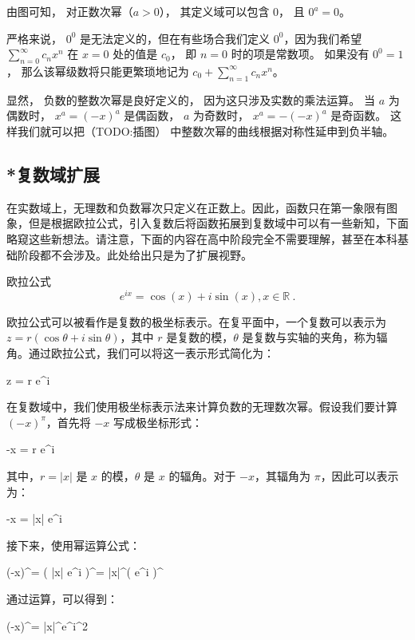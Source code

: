 由图可知， 对正数次幂（$a > 0$）， 其定义域可以包含 $0$， 且 $0^a = 0$。

严格来说， $0^0$ 是无法定义的，但在有些场合我们定义 $0^0$，因为我们希望 $\sum_{n=0}^\infty c_n x^n$ 在 $x = 0$ 处的值是 $c_0$， 即 $n=0$ 时的项是常数项。 如果没有 $0^0 = 1$， 那么该幂级数将只能更繁琐地记为 $c_0 + \sum_{n=1}^\infty c_n x^n$。


显然， 负数的整数次幂是良好定义的， 因为这只涉及实数的乘法运算。 当 $a$ 为偶数时， $x^a = (-x)^a$ 是偶函数， $a$ 为奇数时， $x^a = -(-x)^a$ 是奇函数。 这样我们就可以把（TODO:插图） 中整数次幂的曲线根据对称性延申到负半轴。




\subsection{*复数域扩展}
在实数域上，无理数和负数幂次只定义在正数上。因此，函数只在第一象限有图象，但是根据欧拉公式，引入复数后将函数拓展到复数域中可以有一些新知，下面略窥这些新想法。请注意，下面的内容在高中阶段完全不需要理解，甚至在本科基础阶段都不会涉及。此处给出只是为了扩展视野。

\begin{theorem}{欧拉公式}
\begin{equation}
e^{ix} = \cos(x) + i\sin(x),x\in\mathbb{R}~.
\end{equation}
\end{theorem}

欧拉公式可以被看作是复数的极坐标表示。在复平面中，一个复数可以表示为 $z = r (\cos \theta + i \sin \theta)$，其中 $r$ 是复数的模，$\theta$ 是复数与实轴的夹角，称为辐角。通过欧拉公式，我们可以将这一表示形式简化为：

z = r e^{i\theta}


在复数域中，我们使用极坐标表示法来计算负数的无理数次幂。假设我们要计算 $(-x)^\pi$，首先将 $-x$ 写成极坐标形式：

-x = r \cdot e^{i\theta}

其中，$r = |x|$ 是 $x$ 的模，$\theta$ 是 $x$ 的辐角。对于 $-x$，其辐角为 $\pi$，因此可以表示为：

-x = |x| e^{i\pi}

接下来，使用幂运算公式：

(-x)^\pi = \left( |x| e^{i\pi} \right)^\pi = |x|^\pi \cdot \left( e^{i\pi} \right)^\pi

通过运算，可以得到：

(-x)^\pi = |x|^\pi \cdot e^{i\pi^2}


